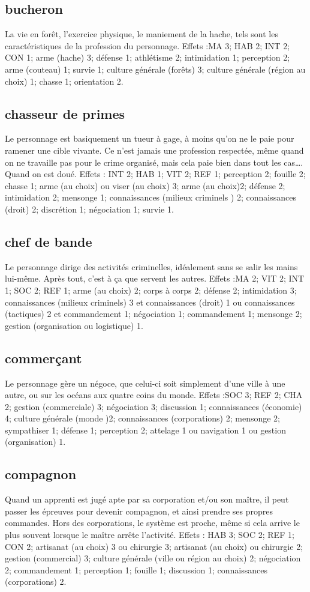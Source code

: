 \documentclass[10pt,a4paper,twocolumn]{book}
\begin{document}
\subsection*{bucheron}
La vie en forêt, l’exercice physique,  le maniement de la hache, tels sont les caractéristiques de la profession du personnage.
Effets :MA 3; HAB 2; INT 2; CON 1; arme (hache) 3; défense 1; athlétisme 2; intimidation 1; perception 2; arme (couteau) 1; survie 1; culture générale (forêts) 3; culture générale (région au choix) 1; chasse 1; orientation 2.
\subsection*{chasseur de primes}
Le personnage est basiquement un tueur à gage, à moins qu’on ne le paie pour ramener une cible vivante. Ce n’est jamais une profession respectée, même quand on ne travaille pas pour le crime organisé, mais cela paie bien dans tout les cas…. Quand on est doué.
Effets : INT 2; HAB 1; VIT 2; REF 1; perception 2; fouille 2; chasse 1; arme (au choix) ou viser (au choix) 3; arme (au choix)2; défense 2; intimidation 2; mensonge 1; connaissances (milieux criminels ) 2; connaissances (droit) 2; discrétion 1; négociation 1; survie 1.
\subsection*{chef de bande}
Le personnage dirige des activités criminelles, idéalement sans se salir les mains lui-même. Après tout, c’est à ça que servent les autres. 
Effets :MA 2; VIT 2; INT 1; SOC 2; REF 1; arme (au choix) 2; corps à corps 2; défense 2; intimidation 3; connaissances (milieux criminels) 3 et connaissances (droit) 1 ou connaissances (tactiques) 2 et commandement 1; négociation 1; commandement 1; mensonge 2; gestion (organisation ou logistique) 1.
\subsection*{commerçant}
Le personnage gère un négoce, que celui-ci soit simplement d’une ville à une autre, ou sur les océans aux quatre coins du monde.
Effets :SOC 3; REF 2; CHA 2; gestion (commerciale) 3; négociation 3; discussion 1; connaissances (économie) 4; culture générale (monde )2; connaissances (corporations) 2; mensonge 2; sympathiser 1; défense 1; perception 2; attelage 1 ou navigation 1 ou gestion (organisation) 1.  

\subsection*{compagnon}
Quand un apprenti est jugé apte par sa corporation et/ou son maître, il peut passer les épreuves pour devenir compagnon, et ainsi prendre ses propres commandes. Hors des corporations, le système est proche, même si cela arrive le plus souvent lorsque le maître arrête l’activité.
Effets : HAB 3; SOC 2; REF 1; CON 2; artisanat (au choix) 3 ou chirurgie 3; artisanat (au choix) ou chirurgie 2; gestion (commercial) 3; culture générale (ville ou région au choix) 2; négociation 2; commandement 1; perception 1; fouille 1; discussion 1; connaissances (corporations) 2.
\end{document}
